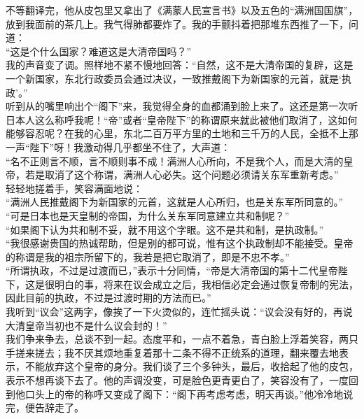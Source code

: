 不等翻译完，他从皮包里又拿出了《满蒙人民宣言书》以及五色的“满洲国国旗”，放到我面前的茶几上。我气得肺都要炸了。我的手颤抖着把那堆东西推了一下，问道：\\

“这是个什么国家？难道这是大清帝国吗？”\\

我的声音变了调。照样地不紧不慢地回答：“自然，这不是大清帝国的复辟，这是一个新国家，东北行政委员会通过决议，一致推戴阁下为新国家的元首，就是‘执政’。”\\

听到从的嘴里响出个“阁下”来，我觉得全身的血都涌到脸上来了。这还是第一次听日本人这么称呼我呢！“帝”或者“皇帝陛下”的称谓原来就此被他们取消了，这如何能够容忍呢？在我的心里，东北二百万平方里的土地和三千万的人民，全抵不上那一声“陛下”呀！我激动得几乎都坐不住了，大声道：\\

“名不正则言不顺，言不顺则事不成！满洲人心所向，不是我个人，而是大清的皇帝，若是取消了这个称谓，满洲人心必失。这个问题必须请关东军重新考虑。”\\

轻轻地搓着手，笑容满面地说：\\

“满洲人民推戴阁下为新国家的元首，这就是人心所归，也是关东军所同意的。”\\

“可是日本也是天皇制的帝国，为什么关东军同意建立共和制呢？”\\

“如果阁下认为共和制不妥，就不用这个字眼。这不是共和制，是执政制。”\\

“我很感谢贵国的热诚帮助，但是别的都可说，惟有这个执政制却不能接受。皇帝的称谓是我的祖宗所留下的，我若是把它取消了，即是不忠不孝。”\\

“所谓执政，不过是过渡而已，”表示十分同情，“帝是大清帝国的第十二代皇帝陛下，这是很明白的事，将来在议会成立之后，我相信必定会通过恢复帝制的宪法，因此目前的执政，不过是过渡时期的方法而已。”\\

我听到“议会”这两字，像挨了一下火烫似的，连忙摇头说：“议会没有好的，再说大清皇帝当初也不是什么议会封的！”\\

我们争来争去，总谈不到一起。态度平和，一点不着急，青白脸上浮着笑容，两只手搓来搓去；我不厌其烦地重复着那十二条不得不正统系的道理，翻来覆去地表示，不能放弃这个皇帝的身分。我们谈了三个多钟头，最后，收拾起了他的皮包，表示不想再谈下去了。他的声调没变，可是脸色更青更白了，笑容没有了，一度回到他口头上的帝的称呼又变成了阁下：“阁下再考虑考虑，明天再谈。”他冷冷地说完，便告辞走了。\\

